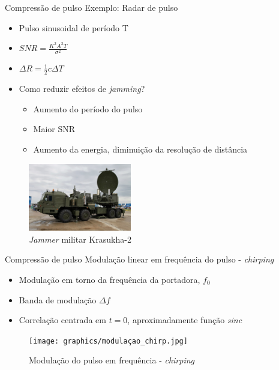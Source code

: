 \documentclass[portuguese,10pt]{beamer}
\begin{document}
\begin{frame}{Compressão de pulso}
    Exemplo: Radar de pulso
    \begin{itemize}
        \item<1-> Pulso sinusoidal de período T
        \item<1-> $SNR = \frac{K^2 A^2 T}{\sigma^2}$
        \item<1-> $\Delta R = \frac{1}{2} c \Delta T$
        \item<1-> Como reduzir efeitos de \textit{jamming}?
        \begin{itemize}
            \item<2-> Aumento do período do pulso
            \item<2-> Maior SNR
            \item<2-> Aumento da energia, diminuição da resolução de distância
        \end{itemize}
    \end{itemize}
\begin{figure}[ht]
\centering
\includegraphics[width=0.4\textwidth]{graphics/jammer_militar.jpg}
\caption{\textit{Jammer} militar Krasukha-2}
\label{jammer_militar}
\end{figure}
\end{frame}

\begin{frame}{Compressão de pulso}
    Modulação linear em frequência do pulso - \textit{chirping}
    \begin{itemize}
        \item<1-> Modulação em torno da frequência da portadora, $f_0$
        \item<1-> Banda de modulação $\Delta f$
        \item<2-> Correlação centrada em $t=0$, aproximadamente função \textit{sinc}
        
    \end{itemize}
    \begin{figure}[ht]
\centering
\texttt{[image: graphics/modulaçao\_chirp.jpg]}
\caption{Modulação do pulso em frequência - \textit{chirping}}
\label{modulacao_chirp}
\end{figure}
\end{frame}
\end{document}
